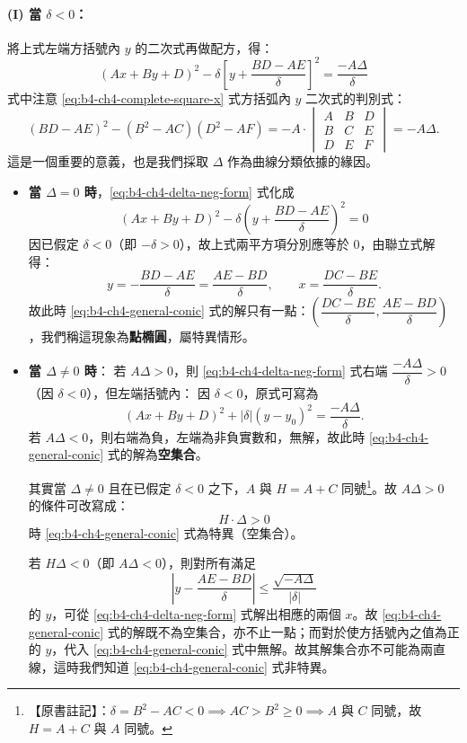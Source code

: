 \paragraph*{(I) 當 $\delta < 0$：} 將上式左端方括號內 $y$ 的二次式再做配方，得：
\begin{equation}
(Ax + By + D)^2 - \delta \left[ y + \frac{BD - AE}{\delta} \right]^2 = \frac{-A\Delta}{\delta}
\label{eq:b4-ch4-delta-neg-form}
\end{equation}
式中注意 \eqref{eq:b4-ch4-complete-square-x} 式方括弧內 $y$ 二次式的判別式：
\[
(BD - AE)^2 - (B^2 - AC)(D^2 - AF) = -A \cdot \begin{vmatrix} A & B & D \\ B & C & E \\ D & E & F \end{vmatrix} = -A\Delta.
\]
這是一個重要的意義，也是我們採取 $\Delta$ 作為曲線分類依據的緣因。

\begin{itemize}
  \item[(i)] \textbf{當 $\Delta = 0$ 時}，\eqref{eq:b4-ch4-delta-neg-form} 式化成
  \[
  (Ax + By + D)^2 - \delta \left( y + \frac{BD - AE}{\delta} \right)^2 = 0
  \]
  因已假定 $\delta < 0$（即 $-\delta > 0$），故上式兩平方項分別應等於 0，由聯立式解得：
  \[
  y = -\frac{BD - AE}{\delta} = \frac{AE - BD}{\delta}, \qquad
  x = \frac{DC - BE}{\delta}.
  \]
  故此時 \eqref{eq:b4-ch4-general-conic} 式的解只有一點：$\left(\dfrac{DC - BE}{\delta}, \dfrac{AE - BD}{\delta}\right)$，我們稱這現象為\textbf{點橢圓}，屬特異情形。

  \item[(ii)] \textbf{當 $\Delta \ne 0$ 時}：
  若 $A\Delta > 0$，則 \eqref{eq:b4-ch4-delta-neg-form} 式右端 $\dfrac{-A\Delta}{\delta} > 0$（因 $\delta < 0$），但左端括號內：
  因 $\delta < 0$，原式可寫為
  \[
  (Ax + By + D)^2 + |\delta|\left( y - y_0 \right)^2 = \frac{-A\Delta}{\delta}.
  \]
  若 $A\Delta < 0$，則右端為負，左端為非負實數和，無解，故此時 \eqref{eq:b4-ch4-general-conic} 式的解為\textbf{空集合}。
  
  其實當 $\Delta \ne 0$ 且在已假定 $\delta < 0$ 之下，$A$ 與 $H = A + C$ 同號\label{note:b4-ch4-same-sign}\footnote{【原書註記】：$\delta = B^2 - AC < 0 \implies AC > B^2 \ge 0 \implies A$ 與 $C$ 同號，故 $H = A + C$ 與 $A$ 同號。}。故 $A\Delta > 0$ 的條件可改寫成：
  \[
  H \cdot \Delta > 0
  \]
  時 \eqref{eq:b4-ch4-general-conic} 式為特異（空集合）。
  
  若 $H\Delta < 0$（即 $A\Delta < 0$），則對所有滿足
  \begin{equation}
  \left| y - \frac{AE - BD}{\delta} \right| \le \frac{\sqrt{-A\Delta}}{|\delta|}
  \label{eq:b4-ch4-ellipse-band}
  \end{equation}
  的 $y$，可從 \eqref{eq:b4-ch4-delta-neg-form} 式解出相應的兩個 $x$。故 \eqref{eq:b4-ch4-general-conic} 式的解既不為空集合，亦不止一點；而對於使方括號內之值為正的 $y$，代入 \eqref{eq:b4-ch4-general-conic} 式中無解。故其解集合亦不可能為兩直線，這時我們知道 \eqref{eq:b4-ch4-general-conic} 式非特異。
\end{itemize}

